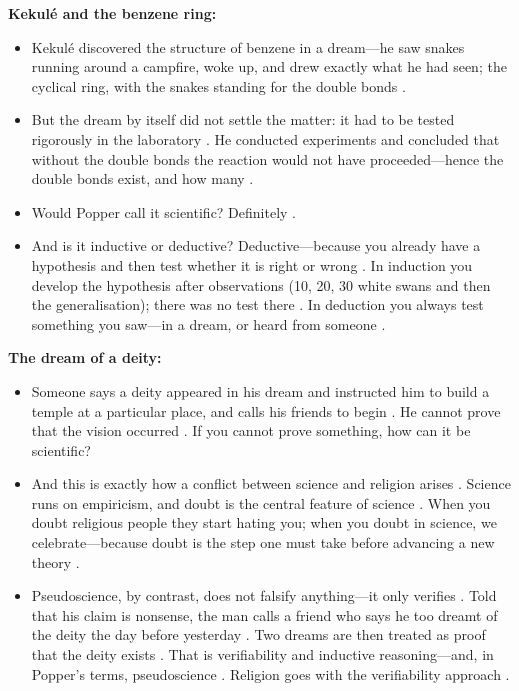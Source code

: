 \begin{ExampleBox}
\textbf{Kekulé and the benzene ring:}
\begin{itemize}
    \item Kekulé discovered the structure of benzene in a dream---he saw snakes running around a campfire, woke up, and drew exactly what he had seen; the cyclical ring, with the snakes standing for the double bonds .
    \item But the dream by itself did not settle the matter: it had to be tested rigorously in the laboratory . He conducted experiments and concluded that without the double bonds the reaction would not have proceeded---hence the double bonds exist, and how many .
    \item Would Popper call it scientific? Definitely .
    \item And is it inductive or deductive? Deductive---because you already have a hypothesis and then test whether it is right or wrong . In induction you develop the hypothesis after observations (10, 20, 30 white swans and then the generalisation); there was no test there . In deduction you always test something you saw---in a dream, or heard from someone .
\end{itemize}
\end{ExampleBox}

\begin{ExampleBox}
\textbf{The dream of a deity:}
\begin{itemize}
    \item Someone says a deity appeared in his dream and instructed him to build a temple at a particular place, and calls his friends to begin . He cannot prove that the vision occurred . If you cannot prove something, how can it be scientific? 
    \item And this is exactly how a conflict between science and religion arises . Science runs on empiricism, and doubt is the central feature of science . When you doubt religious people they start hating you; when you doubt in science, we celebrate---because doubt is the step one must take before advancing a new theory .
    \item Pseudoscience, by contrast, does not falsify anything---it only verifies . Told that his claim is nonsense, the man calls a friend who says he too dreamt of the deity the day before yesterday . Two dreams are then treated as proof that the deity exists . That is verifiability and inductive reasoning---and, in Popper's terms, pseudoscience . Religion goes with the verifiability approach .
\end{itemize}
\end{ExampleBox}

